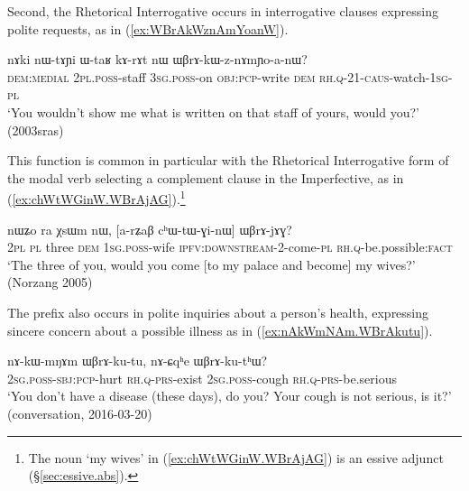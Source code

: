 Second, the Rhetorical Interrogative occurs in interrogative clauses expressing polite requests, as in (\ref{ex:WBrAkWznAmYoanW}).   

\begin{exe}
\ex \label{ex:WBrAkWznAmYoanW}
 \gll nɤki nɯ-tɤɲi ɯ-taʁ kɤ-rɤt nɯ ɯβrɤ-kɯ-z-nɤmɲo-a-nɯ? \\
 \textsc{dem}:\textsc{medial} \textsc{2pl}.\textsc{poss}-staff \textsc{3sg}.\textsc{poss}-on \textsc{obj}:\textsc{pcp}-write \textsc{dem} \textsc{rh}.\textsc{q}-2\fl{}1-\textsc{caus}-watch-\textsc{1sg}-\textsc{pl} \\
 \glt `You wouldn't show me what is written on that staff of yours, would you?' (2003sras)
\end{exe}

 This function is common in particular with the Rhetorical Interrogative form  of the modal verb  selecting a complement clause in the Imperfective, as in (\ref{ex:chWtWGinW.WBrAjAG}).\footnote{The noun  `my wives' in (\ref{ex:chWtWGinW.WBrAjAG}) is an essive adjunct (§\ref{sec:essive.abs}).  }
 

\begin{exe}
\ex \label{ex:chWtWGinW.WBrAjAG}
 \gll nɯʑo ra χsɯm nɯ, [a-rʑaβ cʰɯ-tɯ-ɣi-nɯ] ɯβrɤ-jɤɣ? \\
 \textsc{2pl} \textsc{pl} three \textsc{dem} \textsc{1sg}.\textsc{poss}-wife \textsc{ipfv}:\textsc{downstream}-2-come-\textsc{pl} \textsc{rh}.\textsc{q}-be.possible:\textsc{fact} \\
 \glt `The three of you, would you come [to my palace and become] my wives?' (Norzang 2005)
\end{exe}

The prefix  also occurs in polite inquiries about a person's health, expressing sincere concern about a possible illness as in (\ref{ex:nAkWmNAm.WBrAkutu}).

\begin{exe}
\ex \label{ex:nAkWmNAm.WBrAkutu}
 \gll  nɤ-kɯ-mŋɤm ɯβrɤ-ku-tu, nɤ-ɕqʰe ɯβrɤ-ku-tʰɯ? \\
\textsc{2sg}.\textsc{poss}-\textsc{sbj}:\textsc{pcp}-hurt  \textsc{rh}.\textsc{q}-\textsc{prs}-exist 
\textsc{2sg}.\textsc{poss}-cough  \textsc{rh}.\textsc{q}-\textsc{prs}-be.serious \\
\glt `You don't have a disease (these days), do you? Your cough is not serious, is it?' (conversation, 2016-03-20)
\end{exe}

